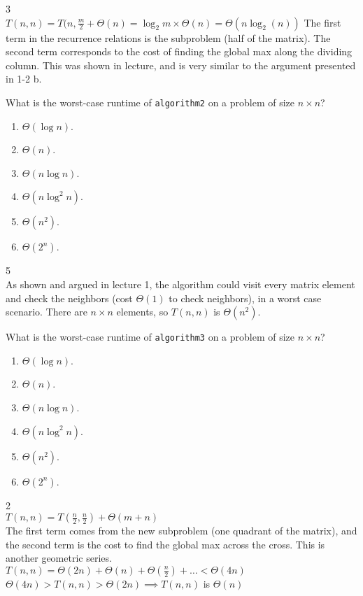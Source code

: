 \documentclass[12pt,twoside]{article}
\begin{document}
\begin{problems}
\begin{problemparts}
\ifsolution \solution{}
3
\\$T(n,n) = T(n,\frac{m}{2} + \Theta(n) = \log_2{m}\times\Theta(n) = \Theta(n\log_2(n))$
The first term in the recurrence relations is the subproblem (half of the matrix).  The second term corresponds to the cost of finding the global max along the dividing column.
This was shown in lecture, and is very similar to the argument presented in 1-2 b.
\fi

\problempart {} What is the worst-case runtime of \texttt{algorithm2} on a problem of size $n \times n$?
\begin{enumerate}
\item $\Theta(\log n)$.
\item $\Theta(n)$.
\item $\Theta(n \log n)$.
\item $\Theta(n \log^2 n)$.
\item $\Theta(n^2)$.
\item $\Theta(2^n)$.
\end{enumerate}

\ifsolution \solution{}
5
\\As shown and argued in lecture 1, the algorithm could visit every matrix element and check the neighbors (cost $\Theta(1)$ to check neighbors), in a worst case scenario.  There are $n\times n$ elements, so $T(n,n)$ is $\Theta(n^2)$.
\fi

\problempart {} What is the worst-case runtime of \texttt{algorithm3} on a problem of size $n \times n$?
\begin{enumerate}
\item $\Theta(\log n)$.
\item $\Theta(n)$.
\item $\Theta(n \log n)$.
\item $\Theta(n \log^2 n)$.
\item $\Theta(n^2)$.
\item $\Theta(2^n)$.
\end{enumerate}

\ifsolution \solution{}
2
\\$T(n,n) = T(\frac{n}{2},\frac{n}{2}) + \Theta(m+n)$
\\The first term comes from the new subproblem (one quadrant of the matrix), and the second term is the cost to find the global max across the cross.  This is another geometric series.
\\$T(n,n) = \Theta(2n) + \Theta(n) + \Theta(\frac{n}{2}) + \ldots < \Theta(4n)$
\\$ \Theta(4n) > T(n,n) > \Theta(2n) \implies T(n,n)$ is $\Theta(n)$
\fi


\end{problemparts}
\end{problems}
\end{document}
